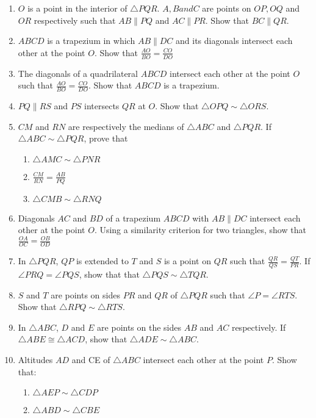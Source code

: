 \begin{enumerate}[label=\thesection.\arabic*.,ref=\thesection.\theenumi]
\item $O$ is a point in the interior of $\triangle PQR$.  $A, B and C$ are points on $OP, OQ$ and $OR$ respectively such that $AB  \parallel  PQ$ and $AC  \parallel  PR$. Show that $BC  \parallel  QR$.
%
\item $ABCD$ is a trapezium in which $AB  \parallel  DC$ and its diagonals intersect each other at the point $O$. Show
that
$\frac{AO}{ BO}=\frac{CO}{  DO}$
%
\item The diagonals of a quadrilateral $ABCD$ intersect each other at the point $O$ such that $\frac{AO}{ BO}=\frac{CO}{  DO}$.   Show that $ABCD$ is a trapezium.
%
\item $PQ \parallel RS$ and $PS$ intersects $QR$ at $O$.  Show that $\triangle OPQ \sim \triangle ORS$.
 \item $CM$ and $RN$ are respectively the medians of $ \triangle  ABC$ and $ \triangle  PQR$. If $ \triangle  ABC  \sim   \triangle  PQR$, prove that 
\begin{enumerate}
\item  $ \triangle  AMC  \sim   \triangle  PNR$ 
\item  $\frac{CM}{RN}=\frac{ AB}{  PQ}$
\item $ \triangle  CMB  \sim   \triangle  RNQ$
%
\end{enumerate}
\item Diagonals $AC$ and $BD$ of a trapezium $ABCD$ with $AB  \parallel  DC$ intersect each other at the point $O$. Using a similarity criterion for two triangles, show that
$\frac{OA}{OC} =  \frac{OB}  {OD}$
%
\item In $\triangle PQR$, $QP$ is extended to $T$ and $S$ is a point on $QR$ such that $ \frac{QR}{QS}=\frac{ QT}{  PR}$. If $\angle PRQ = \angle PQS$, show that 
 that  $\triangle  PQS  \sim   \triangle  TQR$.
\item $S$ and $T$ are points on sides $PR$ and $QR$ of $\triangle PQR$ such that $\angle P = \angle 
 RTS$. Show that $\triangle RPQ \sim \triangle RTS$.
\item  In $\triangle ABC$, $D$ and $E$ are points on the sides $AB$ and $AC$ respectively.  If  $\triangle  ABE \cong   \triangle  ACD$, show that  $\triangle  ADE  \sim   \triangle  ABC$.
\item   Altitudes $AD$ and CE of  $\triangle  ABC$ intersect each other at the point $P$. Show that:
%
\begin{enumerate}
\item   $\triangle  AEP  \sim   \triangle  CDP $
\item   $\triangle  ABD  \sim   \triangle  CBE $

\end{enumerate}
\end{enumerate}
